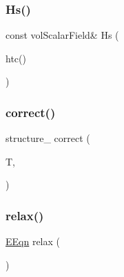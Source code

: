 \mbox{\label{EEqn__1pl_8H_ab8fc5669aa3ba2d4b66ff43ff446d633}} 
\subsubsection{\texorpdfstring{Hs()}{Hs()}}
{\footnotesize\ttfamily const vol\+Scalar\+Field\& Hs (\begin{DoxyParamCaption}\item[{F\+S\+Pair\+\_\+.}]{htc() }\end{DoxyParamCaption})}

\mbox{\label{EEqn__1pl_8H_a915238d7f4f887ccb30334405f32ec94}} 
\subsubsection{\texorpdfstring{correct()}{correct()}\hspace{0.1cm}{\footnotesize\ttfamily [1/2]}}
{\footnotesize\ttfamily structure\+\_\+ correct (\begin{DoxyParamCaption}\item[{\hyperlink{EEqn__1pl_8H_ab8fc5669aa3ba2d4b66ff43ff446d633}{Hs} $\ast$}]{T,  }\item[{\hyperlink{EEqn__1pl_8H_ab8fc5669aa3ba2d4b66ff43ff446d633}{Hs}}]{ }\end{DoxyParamCaption})}

\mbox{\label{EEqn__1pl_8H_a9b1e3cf7921c1d57830a6970779f3d24}} 
\subsubsection{\texorpdfstring{relax()}{relax()}}
{\footnotesize\ttfamily \hyperlink{EEqn__1pl_8H_afbe3b0df5936ee9102f8bea26f93e95a}{E\+Eqn} relax (\begin{DoxyParamCaption}{ }\end{DoxyParamCaption})}

\mbox{\label{EEqn__1pl_8H_ada92f4bf542de36f5c56f50ac3bd22da}} 

